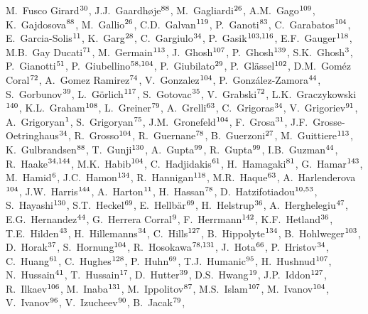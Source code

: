 \begin{flushleft}
M.~Fusco Girard$^{\rm 30}$, 
J.J.~Gaardh{\o}je$^{\rm 88}$, 
M.~Gagliardi$^{\rm 26}$, 
A.M.~Gago$^{\rm 109}$, 
K.~Gajdosova$^{\rm 88}$, 
M.~Gallio$^{\rm 26}$, 
C.D.~Galvan$^{\rm 119}$, 
P.~Ganoti$^{\rm 83}$, 
C.~Garabatos$^{\rm 104}$, 
E.~Garcia-Solis$^{\rm 11}$, 
K.~Garg$^{\rm 28}$, 
C.~Gargiulo$^{\rm 34}$, 
P.~Gasik$^{\rm 103,116}$, 
E.F.~Gauger$^{\rm 118}$, 
M.B.~Gay Ducati$^{\rm 71}$, 
M.~Germain$^{\rm 113}$, 
J.~Ghosh$^{\rm 107}$, 
P.~Ghosh$^{\rm 139}$, 
S.K.~Ghosh$^{\rm 3}$, 
P.~Gianotti$^{\rm 51}$, 
P.~Giubellino$^{\rm 58,104}$, 
P.~Giubilato$^{\rm 29}$, 
P.~Gl\"{a}ssel$^{\rm 102}$, 
D.M.~Gom\'{e}z Coral$^{\rm 72}$, 
A.~Gomez Ramirez$^{\rm 74}$, 
V.~Gonzalez$^{\rm 104}$, 
P.~Gonz\'{a}lez-Zamora$^{\rm 44}$, 
S.~Gorbunov$^{\rm 39}$, 
L.~G\"{o}rlich$^{\rm 117}$, 
S.~Gotovac$^{\rm 35}$, 
V.~Grabski$^{\rm 72}$, 
L.K.~Graczykowski$^{\rm 140}$, 
K.L.~Graham$^{\rm 108}$, 
L.~Greiner$^{\rm 79}$, 
A.~Grelli$^{\rm 63}$, 
C.~Grigoras$^{\rm 34}$, 
V.~Grigoriev$^{\rm 91}$, 
A.~Grigoryan$^{\rm 1}$, 
S.~Grigoryan$^{\rm 75}$, 
J.M.~Gronefeld$^{\rm 104}$, 
F.~Grosa$^{\rm 31}$, 
J.F.~Grosse-Oetringhaus$^{\rm 34}$, 
R.~Grosso$^{\rm 104}$, 
R.~Guernane$^{\rm 78}$, 
B.~Guerzoni$^{\rm 27}$, 
M.~Guittiere$^{\rm 113}$, 
K.~Gulbrandsen$^{\rm 88}$, 
T.~Gunji$^{\rm 130}$, 
A.~Gupta$^{\rm 99}$, 
R.~Gupta$^{\rm 99}$, 
I.B.~Guzman$^{\rm 44}$, 
R.~Haake$^{\rm 34,144}$, 
M.K.~Habib$^{\rm 104}$, 
C.~Hadjidakis$^{\rm 61}$, 
H.~Hamagaki$^{\rm 81}$, 
G.~Hamar$^{\rm 143}$, 
M.~Hamid$^{\rm 6}$, 
J.C.~Hamon$^{\rm 134}$, 
R.~Hannigan$^{\rm 118}$, 
M.R.~Haque$^{\rm 63}$, 
A.~Harlenderova$^{\rm 104}$, 
J.W.~Harris$^{\rm 144}$, 
A.~Harton$^{\rm 11}$, 
H.~Hassan$^{\rm 78}$, 
D.~Hatzifotiadou$^{\rm 10,53}$, 
S.~Hayashi$^{\rm 130}$, 
S.T.~Heckel$^{\rm 69}$, 
E.~Hellb\"{a}r$^{\rm 69}$, 
H.~Helstrup$^{\rm 36}$, 
A.~Herghelegiu$^{\rm 47}$, 
E.G.~Hernandez$^{\rm 44}$, 
G.~Herrera Corral$^{\rm 9}$, 
F.~Herrmann$^{\rm 142}$, 
K.F.~Hetland$^{\rm 36}$, 
T.E.~Hilden$^{\rm 43}$, 
H.~Hillemanns$^{\rm 34}$, 
C.~Hills$^{\rm 127}$, 
B.~Hippolyte$^{\rm 134}$, 
B.~Hohlweger$^{\rm 103}$, 
D.~Horak$^{\rm 37}$, 
S.~Hornung$^{\rm 104}$, 
R.~Hosokawa$^{\rm 78,131}$, 
J.~Hota$^{\rm 66}$, 
P.~Hristov$^{\rm 34}$, 
C.~Huang$^{\rm 61}$, 
C.~Hughes$^{\rm 128}$, 
P.~Huhn$^{\rm 69}$, 
T.J.~Humanic$^{\rm 95}$, 
H.~Hushnud$^{\rm 107}$, 
N.~Hussain$^{\rm 41}$, 
T.~Hussain$^{\rm 17}$, 
D.~Hutter$^{\rm 39}$, 
D.S.~Hwang$^{\rm 19}$, 
J.P.~Iddon$^{\rm 127}$, 
R.~Ilkaev$^{\rm 106}$, 
M.~Inaba$^{\rm 131}$, 
M.~Ippolitov$^{\rm 87}$, 
M.S.~Islam$^{\rm 107}$, 
M.~Ivanov$^{\rm 104}$, 
V.~Ivanov$^{\rm 96}$, 
V.~Izucheev$^{\rm 90}$, 
B.~Jacak$^{\rm 79}$, 

\end{flushleft}
